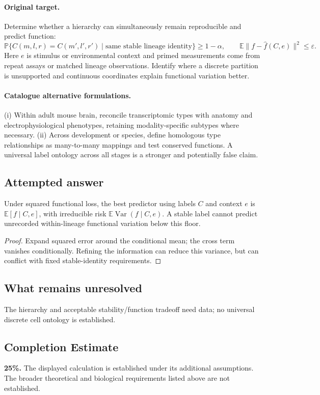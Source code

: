\documentclass[11pt]{article}
\begin{document}
\paragraph{Original target.}
Determine whether a hierarchy can simultaneously remain reproducible and predict function:
\[\mathbb{P}\{C(m,l,r)=C(m',l',r')\mid\text{same stable lineage identity}\}\ge1-\alpha,\qquad \mathbb{E}\|f-\widehat f(C,e)\|^2\le\varepsilon.\]
Here $e$ is stimulus or environmental context and primed measurements come from repeat assays or matched lineage observations. Identify where a discrete partition is unsupported and continuous coordinates explain functional variation better.
\paragraph{Catalogue alternative formulations.}
(i) Within adult mouse brain, reconcile transcriptomic types with anatomy and electrophysiological phenotypes, retaining modality-specific subtypes where necessary. (ii) Across development or species, define homologous type relationships as many-to-many mappings and test conserved functions. A universal label ontology across all stages is a stronger and potentially false claim.
\subsection{Attempted answer}
\begin{proposition}
Under squared functional loss, the best predictor using labels $C$ and context $e$ is $\mathbb{E}[f\mid C,e]$, with irreducible risk $\mathbb{E}\operatorname{Var}(f\mid C,e)$. A stable label cannot predict unrecorded within-lineage functional variation below this floor.
\end{proposition}
\begin{proof}
Expand squared error around the conditional mean; the cross term vanishes conditionally. Refining the information can reduce this variance, but can conflict with fixed stable-identity requirements.
\end{proof}
\subsection{What remains unresolved}
The hierarchy and acceptable stability/function tradeoff need data; no universal discrete cell ontology is established.
\subsection{Completion Estimate}
\textbf{25\%.} The displayed calculation is established under its additional assumptions. The broader theoretical and biological requirements listed above are not established.
\end{document}
